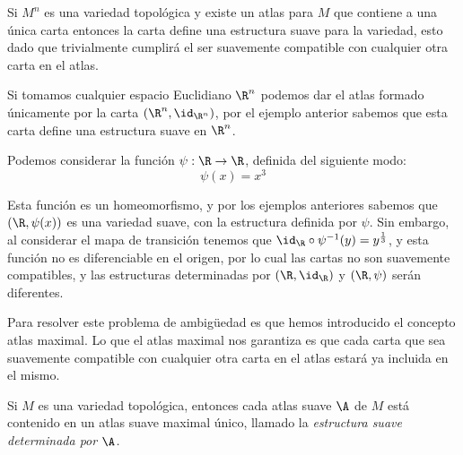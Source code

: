 \begin{example}\label{Ex: Variedad Suave - Carta Unica}
	Si $M^n$ es una variedad topológica y existe un atlas para $M$ que contiene a una única carta entonces la carta define una estructura suave para la variedad, esto dado que trivialmente cumplirá el ser suavemente compatible con cualquier otra carta en el atlas.
\end{example}


\begin{example}\label{Ex: Variedad Suave - Espacios Euclidianos}
	Si tomamos cualquier espacio Euclidiano $\R^n$ podemos dar el atlas formado únicamente por la carta $(\R^n,\id_{\R^n})$, por el ejemplo anterior sabemos que esta carta define una estructura suave en $\R^n$.
\end{example}

\begin{example} %
	Podemos considerar la función $\psi: \R \to \R$, definida del siguiente modo:
	\[
		\psi(x) = x^3
	\]

	Esta función es un homeomorfismo, y por los ejemplos anteriores sabemos que $(\R, \psi(x))$ es una variedad suave, con la estructura definida por  $\psi$. Sin embargo, al considerar el mapa de transición tenemos que $\id_{\R} \circ \psi^{-1}(y) = y^{\frac{1}{3}}$, y esta función no es diferenciable en el origen, por lo cual las cartas no son suavemente compatibles, y las estructuras determinadas por $(\R, \id_{\R})$ y $(\R,\psi)$ serán diferentes.
\end{example}

Para resolver este problema de ambigüedad es que hemos introducido el concepto atlas maximal. Lo que el atlas maximal nos garantiza es que cada carta que sea suavemente compatible con cualquier otra carta en el atlas estará ya incluida en el mismo.

\begin{theorem}
	Si $M$ es una variedad topológica, entonces cada atlas suave $\A$ de $M$ está contenido en un atlas suave maximal único, llamado la \it{estructura suave determinada por $\A$}.
\end{theorem}

